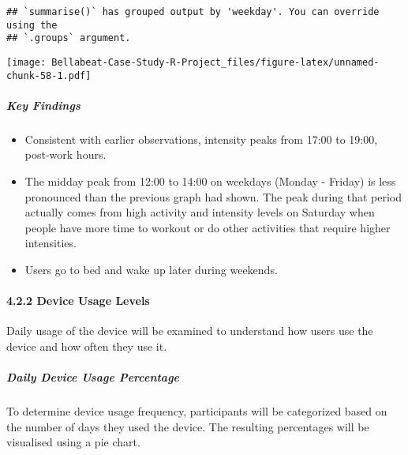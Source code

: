 \documentclass[
]{article}
\providecommand{\tightlist}{%
  \setlength{\itemsep}{0pt}\setlength{\parskip}{0pt}}
\begin{document}
\begin{verbatim}
## `summarise()` has grouped output by 'weekday'. You can override using the
## `.groups` argument.
\end{verbatim}

\texttt{[image: Bellabeat-Case-Study-R-Project\_files/figure-latex/unnamed-chunk-58-1.pdf]}

\hypertarget{key-findings-4}{%
\subparagraph{Key Findings}\label{key-findings-4}}

\begin{itemize}
\tightlist
\item
  Consistent with earlier observations, intensity peaks from 17:00 to
  19:00, post-work hours.
\item
  The midday peak from 12:00 to 14:00 on weekdays (Monday - Friday) is
  less pronounced than the previous graph had shown. The peak during
  that period actually comes from high activity and intensity levels on
  Saturday when people have more time to workout or do other activities
  that require higher intensities.
\item
  Users go to bed and wake up later during weekends.
\end{itemize}

\hypertarget{device-usage-levels}{%
\paragraph{4.2.2 Device Usage Levels}\label{device-usage-levels}}

Daily usage of the device will be examined to understand how users use
the device and how often they use it.

\hypertarget{daily-device-usage-percentage}{%
\subparagraph{Daily Device Usage
Percentage}\label{daily-device-usage-percentage}}

To determine device usage frequency, participants will be categorized
based on the number of days they used the device. The resulting
percentages will be visualised using a pie chart.
\end{document}
